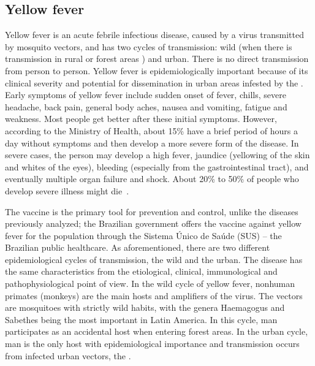 \subsection{Yellow fever}
%
Yellow fever is an acute febrile infectious disease, caused by a virus transmitted by mosquito vectors, and has two cycles of transmission: wild (when there is transmission in rural or forest areas ) and urban.
There is no direct transmission from person to person.
Yellow fever is epidemiologically important because of its clinical severity and potential for dissemination in urban areas infested by the \Aedes.
Early symptoms of yellow fever include sudden onset of fever, chills, severe headache, back pain, general body aches, nausea and vomiting, fatigue and weakness. Most people get better after these initial symptoms. However, according to the Ministry of Health, about 15\% have a brief period of hours a day without symptoms and then develop a more severe form of the disease. In severe cases, the person may develop a high fever, jaundice (yellowing of the skin and whites of the eyes), bleeding (especially from the gastrointestinal tract), and eventually multiple organ failure and shock. About 20\% to 50\% of people who develop severe illness might die~\cite{web:MSyellowfever}.

The vaccine is the primary tool for prevention and control, unlike the diseases previously analyzed; the Brazilian government offers the vaccine against yellow fever for the population through the Sistema Único de Saúde (SUS) -- the Brazilian public healthcare.
As aforementioned, there are two different epidemiological cycles of transmission, the wild and the urban.
The disease has the same characteristics from the etiological, clinical, immunological and pathophysiological point of view. In the wild cycle of yellow fever, nonhuman primates (monkeys) are the main hosts and amplifiers of the virus. The vectors are mosquitoes with strictly wild habits, with the genera Haemagogus and Sabethes being the most important in Latin America. In this cycle, man participates as an accidental host when entering forest areas. In the urban cycle, man is the only host with epidemiological importance and transmission occurs from infected urban vectors, the \Aedes\cite{camara2011dynamic}.


